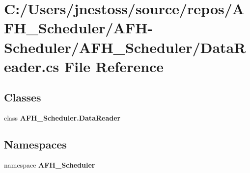 \section{C\+:/\+Users/jnestoss/source/repos/\+A\+F\+H\+\_\+\+Scheduler/\+A\+F\+H-\/\+Scheduler/\+A\+F\+H\+\_\+\+Scheduler/\+Data\+Reader.cs File Reference}
\label{_data_reader_8cs}
\subsection*{Classes}
\begin{DoxyCompactItemize}
\item 
class \textbf{ A\+F\+H\+\_\+\+Scheduler.\+Data\+Reader}
\end{DoxyCompactItemize}
\subsection*{Namespaces}
\begin{DoxyCompactItemize}
\item 
namespace \textbf{ A\+F\+H\+\_\+\+Scheduler}
\end{DoxyCompactItemize}
